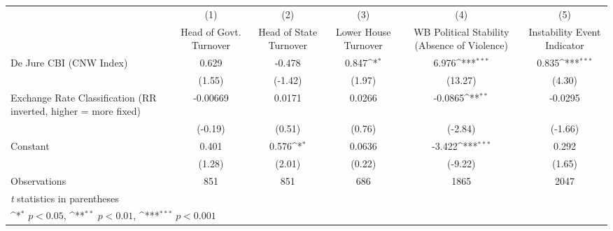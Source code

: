{
\def\sym#1{\ifmmode^{#1}\else\(^{#1}\)\fi}
\begin{tabular*}{\linewidth}{@{\hskip\tabcolsep\extracolsep\fill}l*{5}{c}}
\toprule
                &\multicolumn{1}{c}{(1)}&\multicolumn{1}{c}{(2)}&\multicolumn{1}{c}{(3)}&\multicolumn{1}{c}{(4)}&\multicolumn{1}{c}{(5)}\\
                &\multicolumn{1}{c}{Head of Govt. Turnover}&\multicolumn{1}{c}{Head of State Turnover}&\multicolumn{1}{c}{Lower House Turnover}&\multicolumn{1}{c}{WB Political Stability (Absence of Violence)}&\multicolumn{1}{c}{Instability Event Indicator}\\
\midrule
De Jure CBI (CNW Index)&    0.629         &   -0.478         &    0.847\sym{*}  &    6.976\sym{***}&    0.835\sym{***}\\
                &   (1.55)         &  (-1.42)         &   (1.97)         &  (13.27)         &   (4.30)         \\
\addlinespace
Exchange Rate Classification (RR inverted, higher = more fixed)& -0.00669         &   0.0171         &   0.0266         &  -0.0865\sym{**} &  -0.0295         \\
                &  (-0.19)         &   (0.51)         &   (0.76)         &  (-2.84)         &  (-1.66)         \\
\addlinespace
Constant        &    0.401         &    0.576\sym{*}  &   0.0636         &   -3.422\sym{***}&    0.292         \\
                &   (1.28)         &   (2.01)         &   (0.22)         &  (-9.22)         &   (1.65)         \\
\midrule
Observations    &      851         &      851         &      686         &     1865         &     2047         \\
\bottomrule
\multicolumn{6}{l}{\footnotesize \textit{t} statistics in parentheses}\\
\multicolumn{6}{l}{\footnotesize \sym{*} \(p<0.05\), \sym{**} \(p<0.01\), \sym{***} \(p<0.001\)}\\
\end{tabular*}
}
